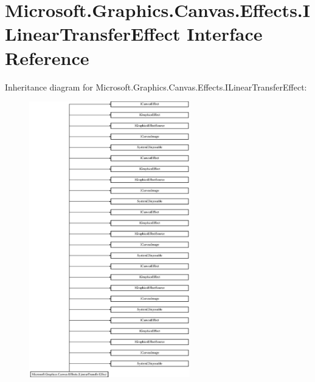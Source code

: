 \hypertarget{interface_microsoft_1_1_graphics_1_1_canvas_1_1_effects_1_1_i_linear_transfer_effect}{}\section{Microsoft.\+Graphics.\+Canvas.\+Effects.\+I\+Linear\+Transfer\+Effect Interface Reference}
\label{interface_microsoft_1_1_graphics_1_1_canvas_1_1_effects_1_1_i_linear_transfer_effect}
Inheritance diagram for Microsoft.\+Graphics.\+Canvas.\+Effects.\+I\+Linear\+Transfer\+Effect\+:\begin{figure}[H]
\begin{center}
\leavevmode
\includegraphics[height=12.000000cm]{interface_microsoft_1_1_graphics_1_1_canvas_1_1_effects_1_1_i_linear_transfer_effect}
\end{center}
\end{figure}
